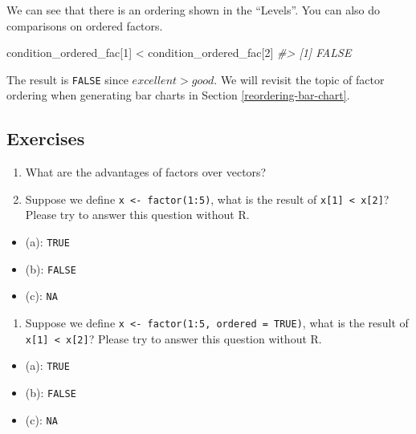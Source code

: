\documentclass[
]{book}
\newenvironment{Shaded}{\begin{snugshade}}{\end{snugshade}}
\newcommand{\CommentTok}[1]{\textcolor[rgb]{0.56,0.35,0.01}{\textit{#1}}}
\newcommand{\DecValTok}[1]{\textcolor[rgb]{0.00,0.00,0.81}{#1}}
\newcommand{\NormalTok}[1]{#1}
\newcommand{\SpecialCharTok}[1]{\textcolor[rgb]{0.00,0.00,0.00}{#1}}
\providecommand{\tightlist}{%
  \setlength{\itemsep}{0pt}\setlength{\parskip}{0pt}}
\begin{document}
We can see that there is an ordering shown in the ``Levels''. You can also do comparisons on ordered factors.

\begin{Shaded}
\begin{Highlighting}[]
\NormalTok{condition\_ordered\_fac[}\DecValTok{1}\NormalTok{] }\SpecialCharTok{\textless{}}\NormalTok{ condition\_ordered\_fac[}\DecValTok{2}\NormalTok{]}
\CommentTok{\#\textgreater{} [1] FALSE}
\end{Highlighting}
\end{Shaded}

The result is \texttt{FALSE} since \(excellent > good\). We will revisit the topic of factor ordering when generating bar charts in Section \ref{reordering-bar-chart}.

\hypertarget{exercises-13}{%
\subsection{Exercises}\label{exercises-13}}

\begin{enumerate}
\def\labelenumi{\arabic{enumi}.}
\tightlist
\item
  What are the advantages of factors over vectors?
\item
  Suppose we define \texttt{x\ \textless{}-\ factor(1:5)}, what is the result of \texttt{x{[}1{]}\ \textless{}\ x{[}2{]}}? Please try to answer this question without R.
\end{enumerate}

\begin{itemize}
\tightlist
\item
  (a): \texttt{TRUE}
\item
  (b): \texttt{FALSE}
\item
  (c): \texttt{NA}
\end{itemize}

\begin{enumerate}
\def\labelenumi{\arabic{enumi}.}
\setcounter{enumi}{2}
\tightlist
\item
  Suppose we define \texttt{x\ \textless{}-\ factor(1:5,\ ordered\ =\ TRUE)}, what is the result of \texttt{x{[}1{]}\ \textless{}\ x{[}2{]}}? Please try to answer this question without R.
\end{enumerate}

\begin{itemize}
\tightlist
\item
  (a): \texttt{TRUE}
\item
  (b): \texttt{FALSE}
\item
  (c): \texttt{NA}
\end{itemize}
\end{document}
